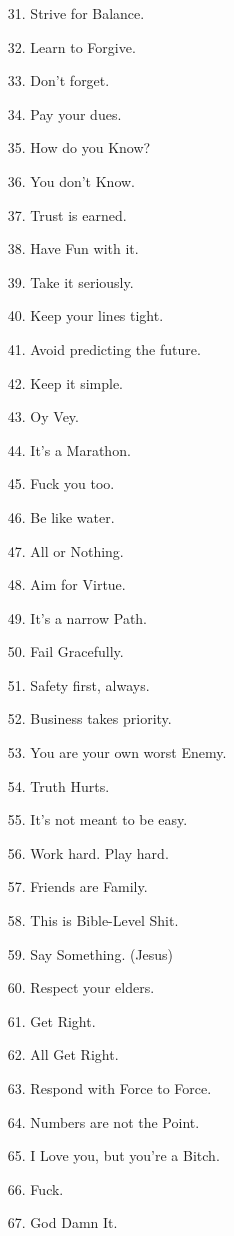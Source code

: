 \documentclass[11pt]{article}
\begin{document}
\begin{enumerate}
	\item[31.] Strive for Balance.
	\item[32.] Learn to Forgive.
	\item[33.] Don't forget.
	\item[34.] Pay your dues.
	\item[35.] How do you Know?
	\item[36.] You don't Know.
	\item[37.] Trust is earned.
	\item[38.] Have Fun with it.
	\item[39.] Take it seriously.
	\item[40.] Keep your lines tight.
	\item[41.] Avoid predicting the future.
	\item[42.] Keep it simple.
	\item[43.] Oy Vey.
	\item[44.] It's a Marathon.
	\item[45.] Fuck you too.
	\item[46.] Be like water.
	\item[47.] All or Nothing.
	\item[48.] Aim for Virtue.
	\item[49.] It's a narrow Path.
	\item[50.] Fail Gracefully.
	\item[51.] Safety first, always.
	\item[52.] Business takes priority.
	\item[53.] You are your own worst Enemy.
	\item[54.] Truth Hurts.
	\item[55.] It's not meant to be easy.
	\item[56.] Work hard. Play hard.
	\item[57.] Friends are Family.
	\item[58.] This is Bible-Level Shit.
	\item[59.] Say Something. (Jesus)
	\item[60.] Respect your elders.
	\item[61.] Get Right.
	\item[62.] All Get Right.
	\item[63.] Respond with Force to Force.
	\item[64.] Numbers are not the Point.
	\item[65.] I Love you, but you're a Bitch.
	\item[66.] Fuck.
	\item[67.] God Damn It.

\end{enumerate}
\end{document}
